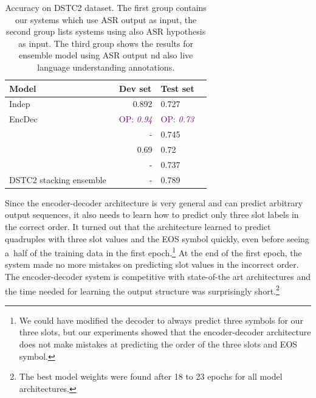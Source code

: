 \documentclass{itatnew}
\def\OP#1{\textcolor{purple}{OP: \textit{#1}}}
\begin{document}
\begin{table}
\vspace{-0.80em}
\begin{center}
\begin{tabular}{l@{\quad}rll}
\hline
\multicolumn{1}{l}{\rule{0pt}{12pt}
                   Model}&\multicolumn{1}{l}{Dev set}&\multicolumn{2}{l}{Test set}\\[2pt]
\hline\rule{0pt}{12pt}
    Indep  &   0.892 & 0.727 \\
    EncDec &   \OP{0.94} & \OP{0.73} \\
\hline
    \citet{vodolan2015hybrid} & - & 0.745 \\
    \citet{zilka2015incremental} & 0.69 & 0.72 \\
    \citet{henderson2013deep} & - & 0.737 \\
\hline
    DSTC2 stacking ensemble~\cite{henderson2014second} & - & 0.789 \\
\hline
\end{tabular}
\caption{Accuracy on DSTC2 dataset. The first group contains our systems which use ASR output as input, the second group lists systems using also ASR hypothesis as input. The third group shows the results for ensemble model using ASR output nd also live language understanding annotations.}
\vspace{-2em}
\end{center}
\label{tab:dstc}
\end{table}

Since the encoder-decoder architecture is very general and can predict arbitrary output sequences, it also needs to learn how to predict only three slot labels in the correct order.
It turned out that the architecture learned to predict quadruples with three slot values and the EOS symbol quickly, even before seeing a~half of the training data in the first epoch.\footnote{We could have modified the decoder to always predict three symbols for our three slots, but our experiments showed that the encoder-decoder architecture does not make mistakes at predicting the order of the three slots and EOS symbol.}  
At the end of the first epoch, the system made no more mistakes on predicting slot values in the incorrect order.
The encoder-decoder system is competitive with state-of-the art architectures and the time needed for learning the output structure was surprisingly short.\footnote{The best model weights were found after 18 to 23 epochs for all model architectures.}
\end{document}
